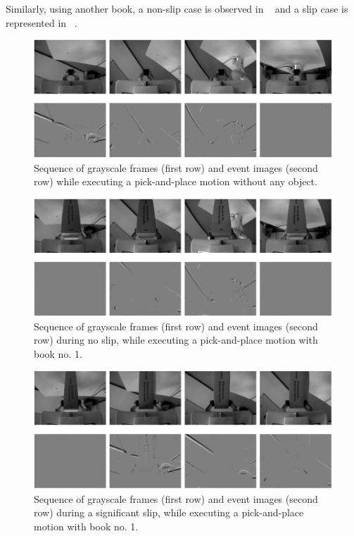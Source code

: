 Similarly, using another book, a non-slip case is observed in ~ and a slip case is represented in ~.

\begin{figure}[H]
    \centering
    \includegraphics[width=\textwidth]{resources/images/set2_empty}
    \caption{Sequence of grayscale frames (first row) and event images (second row) while executing a pick-and-place motion without any object.}\label{fig:set2_empty}
\end{figure}

\begin{figure}[H]
    \centering
    \includegraphics[width=\textwidth]{resources/images/set2_case1}
    \caption{Sequence of grayscale frames (first row) and event images (second row) during no slip, while executing a pick-and-place motion with book no. 1.}\label{fig:set2_case1}
\end{figure}

\begin{figure}[H]
    \centering
    \includegraphics[width=\textwidth]{resources/images/set2_case2}
    \caption{Sequence of grayscale frames (first row) and event images (second row) during a significant slip, while executing a pick-and-place motion with book no. 1.}\label{fig:set2_case2}
\end{figure}

